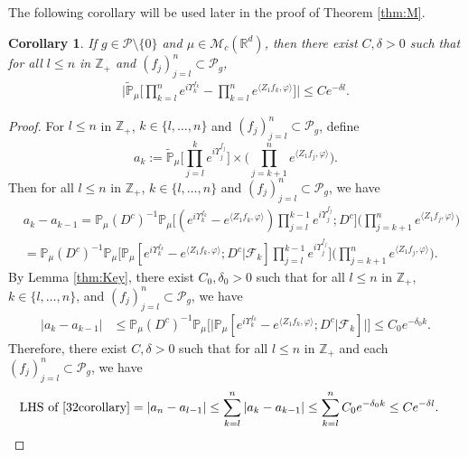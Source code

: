 \documentclass[12pt,a4paper]{amsart}
\theoremstyle{plain}
\newtheorem{cor}[thm]{Corollary}
\theoremstyle{definition}
\numberwithin{equation}{section}
\begin{document}
The following corollary  will be used later in the proof of Theorem \ref{thm:M}.
\begin{cor}
  \label{cor:MI}
If  $g\in \mathcal{P}\setminus\{0\}$ and $\mu\in \mathcal M_c(\mathbb R^d)$, then there exist $C,\delta>0$ such that for
all $l\leq n$ in $\mathbb Z_+$ and  $(f_j)_{j=l}^n\subset \mathcal P_g$,
\begin{align}
  \label{32corollary}
  \Big|\mathbb{\widetilde{P}}_{\mu}\Big[\prod_{k=l}^ne^{i \Upsilon^{f_k}_{k} }-\prod_{k=l}^n e^{\langle Z_1f_k, \varphi\rangle}\Big]\Big|\leq C e^{-\delta l}.
\end{align}
\end{cor}
\begin{proof}
  For  $l\leq n$ in $\mathbb Z_+$, $k \in \{l,\dots,n\}$ and $(f_j)_{j=l}^n\subset \mathcal P_g$, define
  \[
    a_k
    :=  \mathbb{\widetilde{P}}_{\mu}\Big[\prod_{j=l}^{k} e^{i\Upsilon_j^{f_j}}\Big] \times \Big(\prod_{j=k+1}^{n} e^{ \langle Z_1f_j,\varphi \rangle} \Big).
  \]
  Then for all $l\leq n$ in $\mathbb Z_+$, $k \in \{l,\dots,n\}$ and $(f_j)_{j=l}^n\subset \mathcal P_g$, we have
  \begin{align}
    & a_{k} - a_{k-1}
      =\mathbb{P}_{\mu}(D^c)^{-1} \mathbb{P}_{\mu}\Big[(e^{i\Upsilon^{f_k}_k}-e^{\langle Z_1f_k, \varphi\rangle})\prod_{j=l}^{k-1} e^{i\Upsilon_j^{f_j}};D^c\Big] \Big(\prod_{j=k+1}^n e^{\langle Z_1f_j, \varphi\rangle}\Big)\\
    & =\mathbb{P}_{\mu}(D^c)^{-1} \mathbb{P}_{\mu}\Big[\mathbb P_\mu[e^{i\Upsilon_k^{f_k}}-e^{\langle Z_1f_k, \varphi \rangle}; D^c|\mathscr F_k] \prod_{j=l}^{k-1} e^{i\Upsilon_j^{f_j}}\Big] \Big(\prod_{j=k+1}^{n}e^{\langle Z_1f_j, \varphi\rangle}\Big).
  \end{align}
  By Lemma \ref{thm:Key}, there exist $C_0,\delta_0 >0$ such that for all $l\leq n$ in $\mathbb Z_+$,  $k \in \{l,\dots , n\}$, and $(f_j)_{j=l}^n\subset \mathcal P_g$, we have
  \begin{align}
    | a_{k} - a_{k-1}|
    & \leq \mathbb{P}_{\mu}(D^c)^{-1}\mathbb{P}_{\mu}\Big[\big|\mathbb P_\mu[e^{i\Upsilon_k^{f_k}}-e^{\langle Z_1f_k, \varphi \rangle}; D^c | \mathscr{F}_k]\big|\Big]
    \leq C_0 e^{-\delta_0 k}.
  \end{align}
  Therefore, there exist $C,\delta >0$ such that for all $l\leq n$ in $\mathbb Z_+$ and each $(f_j)_{j=l}^n\subset \mathcal P_g$, we have
  \begin{align}
    \text{LHS of \eqref{32corollary}}
    & = \left|a_n-a_{l-1}\right|
      \leq \sum_{k=l}^n\left|a_{k}-a_{k-1}\right|
      \leq \sum_{k=l}^n C_0 e^{-\delta_0 k}
      \leq C e^{- \delta l}.
      \qedhere
  \end{align}
\end{proof}
\end{document}
